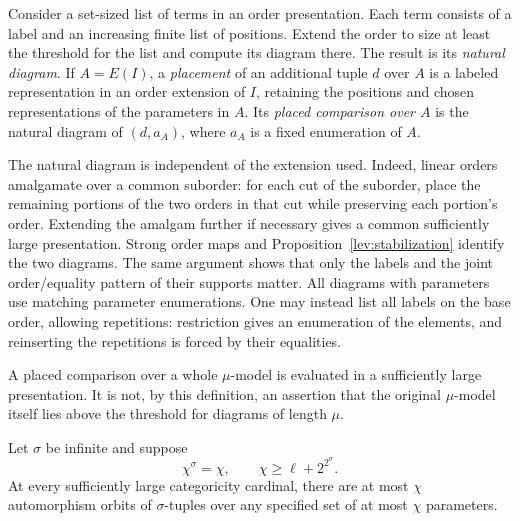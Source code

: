 \begin{definition}
\label{lev:natural-diagrams}
Consider a set-sized list of terms in an order presentation. Each
term consists of a label and an increasing finite list of positions.
Extend the order to size at least the threshold for the list and
compute its diagram there. The result is its \emph{natural diagram}.
If \(A=E(I)\), a \emph{placement} of an additional tuple \(d\)
over \(A\) is a labeled representation in an order extension of
\(I\), retaining the positions and chosen representations of the
parameters in \(A\). Its \emph{placed comparison over \(A\)} is
the natural diagram of \((d,a_A)\), where \(a_A\) is a fixed
enumeration of \(A\).
\end{definition}

The natural diagram is independent of the extension used. Indeed,
linear orders amalgamate over a common suborder: for each cut of
the suborder, place the remaining portions of the two orders in
that cut while preserving each portion's order. Extending the
amalgam further if necessary gives a common sufficiently large
presentation. Strong order maps and
Proposition~\ref{lev:stabilization} identify the two diagrams.
The same argument shows that only the labels and the joint
order/equality pattern of their supports matter. All diagrams
with parameters use matching parameter enumerations. One may
instead list all labels on the base order, allowing repetitions:
restriction gives an enumeration of the elements, and reinserting
the repetitions is forced by their equalities.

A placed comparison over a whole \(\mu\)-model is evaluated in a
sufficiently large presentation. It is not, by this definition,
an assertion that the original \(\mu\)-model itself lies above the
threshold for diagrams of length \(\mu\).

\begin{lemma}
\label{lev:parameter-orbits}
Let \(\sigma\) be infinite and suppose
\[
 \chi^\sigma=\chi,
 \qquad \chi\ge \ell+2^{2^\sigma}.
\]
At every sufficiently large categoricity cardinal, there are at
most \(\chi\) automorphism orbits of \(\sigma\)-tuples over any
specified set of at most \(\chi\) parameters.
\end{lemma}

